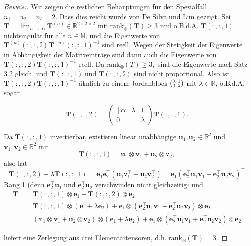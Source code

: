 \documentclass[11pt]{article} %
\begin{document}
\begin{changemargin}{0pt}{0pt}
\begin{proof}[\underline{Beweis:}\nopunct]
Wir zeigen die restlichen Behauptungen für den Spezialfall $n_{1} = n_{2} = n_{3} = 2.$ Dass dies reicht wurde von De Silva und Lim gezeigt.
Sei $\mathbf{T} = \lim_{n\rightarrow\infty} \mathbf{T}^{(n)} \in \mathbb{R}^{2\times 2\times 2}$ mit $ \text{rank}_{\otimes}(\mathbf{T})\geq 3$ und
o.B.d.A. $\mathbf{T}(:,:,1)$ nichtsingulär für alle $n \in \mathbb{N}$, und die Eigenwerte von $\mathbf{T}^{(n)}(:,:,2)\mathbf{T}^{(n)}(:,:,1)^{-1}$ sind
reell. Wegen der Stetigkeit der Eigenwerte in Abhängigkeit der Matrixeinträge sind dann auch die Eigenwerte von 
$\mathbf{T}(:,:,2)\mathbf{T}(:,:,1)^{-1}$ reell. Da $\text{rank}_{\otimes}(T)\geq 3,$ sind die Eigenwerte nach Satz 3.2 gleich, und $\mathbf{T}(:,:,1)$ 
und $\mathbf{T}(:,:,2)$ sind nicht proportional. Also ist $\mathbf{T}(:,:,2)\mathbf{T}(:,:,1)^{-1}$ ähnlich zu einem Jordanblock 
$(^{\lambda \hspace{1mm} 1}_{0 \hspace{1mm} \lambda})$ mit $\lambda \in \mathbb{R}$, o.B.d.A. sogar

\[ \mathbf{T}(:,:,2) = \begin{pmatrix}[cc] \lambda & 1 \\ 0 & \lambda \end{pmatrix} \mathbf{T}(:,:,1).\]

Da $\mathbf{T}(:,:,1)$ invertierbar, existieren linear unabhängige $\mathbf{u}_{1},\mathbf{u}_{2} \in \mathbb{R}^{2}$ und $\mathbf{v}_{1},
\mathbf{v}_{2} \in \mathbb{R}^{2}$ mit
\[ \mathbf{T}(:,:,1) = \mathbf{u}_{1}\otimes\mathbf{v}_{1}+\mathbf{u}_{2}\otimes\mathbf{v}_{2},\]
also hat
\[ \mathbf{T}(:,:,2) - \lambda\mathbf{T}(:,:,1) = \mathbf{e}_{1}\mathbf{e}_{2}^{\top}(\mathbf{u}_{1}\mathbf{v}_{1}^{\top} 
+ \mathbf{u}_{2}\mathbf{v}_{2}^{\top}) = \mathbf{e}_{1}(\mathbf{e}_{2}^{\top}\mathbf{u}_{1}\mathbf{v}_{1}
+ \mathbf{e}_{2}^{\top}\mathbf{u}_{2}\mathbf{v}_{2})^{\top} \]
Rang 1 (denn $\mathbf{e}_{2}^{\top}\mathbf{u}_{1}$ und $\mathbf{e}_{2}^{\top}\mathbf{u}_{2}$ verschwinden nicht gleichzeitig) und
\begin{align*} \mathbf{T} &= \mathbf{T}(:,:,1)\otimes \mathbf{e}_{1} + \mathbf{T}(:,:,2)\otimes \mathbf{e}_{2}\\
&= \mathbf{T}(:,:,1)\otimes(\mathbf{e}_{1}+\lambda\mathbf{e}_2) + \mathbf{e}_1\otimes(\mathbf{e}_{2}^{\top}\mathbf{u}_{1}\mathbf{v}_{1}
+ \mathbf{e}_{2}^{\top}\mathbf{u}_{2}\mathbf{v}_{2})\otimes \mathbf{e}_{2}\\
&= (\mathbf{u}_{1}\otimes \mathbf{v}_{1} + \mathbf{u}_{2}\otimes\mathbf{v}_{2})\otimes(\mathbf{e}_{1}+\lambda\mathbf{e}_{2})
+ \mathbf{e}_{1}\otimes(\mathbf{e}_{2}^{\top}\mathbf{u}_{1}\mathbf{v}_{1} + \mathbf{e}_{2}^{\top}\mathbf{u}_{2}\mathbf{v}_{2})\otimes
\mathbf{e}_{2}
\end{align*}

liefert eine Zerlegung aus drei Elementartensoren, d.h. $\text{rank}_{\otimes}(\mathbf{T}) = 3.$
\end{proof}

\end{changemargin}
\end{document}
